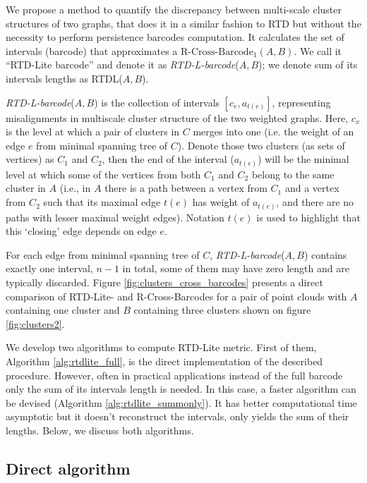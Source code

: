 \documentclass[twoside]{article}
\begin{document}
We propose a method to quantify the discrepancy between multi-scale cluster structures of two graphs, that does it in a similar fashion to RTD but without the necessity to perform persistence barcodes computation. It calculates the set of intervals (barcode) that approximates a $\text{R-Cross-Barcode}_1(A, B)$.
We call it ``RTD-Lite barcode''  and denote it as \textit{RTD-L-barcode}($A, B$); we denote sum of its intervals lengths as RTDL($A, B$).

\textit{RTD-L-barcode}($A, B$) is the collection of intervals $[c_e, a_{t(e)}]$, representing misalignments in multiscale cluster structure of the two weighted graphs. Here, $c_x$ is the level at which a pair of clusters in $C$ merges into one (i.e. the weight of an edge $e$ from minimal spanning tree of $C$). Denote those two clusters (as sets of vertices) as $C_1$ and $C_2$, then the end of the interval ($a_{t(e)}$) will be the minimal level at which some of the vertices from both $C_1$ and $C_2$ belong to the same cluster in $A$ (i.e., in $A$ there is a path between a vertex from $C_1$ and a vertex from $C_2$ such that its maximal edge $t(e)$ has weight of $a_{t(e)}$, and there are no paths with lesser maximal weight edges). Notation $t(e)$ is used to highlight that this `closing' edge depends on edge $e$.

For each edge from minimal spanning tree of $C$, \textit{RTD-L-barcode}($A, B$) contains exactly one interval, $n - 1$ in total, some of them may have zero length and are typically discarded. Figure \ref{fig:clusters_cross_barcodes} presents a direct comparison of RTD-Lite- and R-Cross-Barcodes for a pair of point clouds with $A$ containing one cluster and $B$ containing three clusters shown on figure \ref{fig:clusters2}.

We develop two algorithms to compute RTD-Lite metric. First of them, Algorithm \ref{alg:rtdlite_full}, is the direct implementation of the described procedure. However, often in practical applications instead of the full barcode only the sum of its intervals length is needed. In this case, a faster algorithm can be devised (Algorithm \ref{alg:rtdlite_summonly}). It has better computational time asymptotic but it doesn't reconstruct the intervals, only yields the sum of their lengths. Below, we discuss both algorithms.


\subsection{Direct algorithm}
\end{document}
